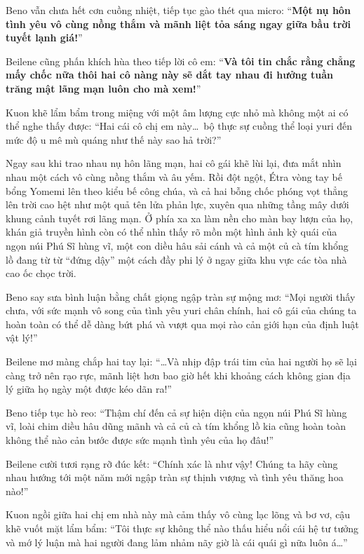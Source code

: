 \documentclass[../main.tex]{subfiles}
\begin{document}
Beno vẫn chưa hết cơn cuồng nhiệt, tiếp tục gào thét qua micro: ``\textbf{Một nụ hôn tình yêu vô cùng nồng thắm và mãnh liệt tỏa sáng ngay giữa bầu trời tuyết lạnh giá!}''

Beilene cũng phấn khích hùa theo tiếp lời cô em: ``\textbf{Và tôi tin chắc rằng chẳng mấy chốc nữa thôi hai cô nàng này sẽ dắt tay nhau đi hưởng tuần trăng mật lãng mạn luôn cho mà xem!}''

Kuon khẽ lẩm bẩm trong miệng với một âm lượng cực nhỏ mà không một ai có thể nghe thấy được: ``Hai cái cô chị em này\dots\ bộ thực sự cuồng thể loại yuri đến mức độ u mê mù quáng như thế này sao hả trời?''

Ngay sau khi trao nhau nụ hôn lãng mạn, hai cô gái khẽ lùi lại, đưa mắt nhìn nhau một cách vô cùng nồng thắm và âu yếm. Rồi đột ngột, Étra vòng tay bế bổng Yomemi lên theo kiểu bế công chúa, và cả hai bỗng chốc phóng vọt thẳng lên trời cao hệt như một quả tên lửa phản lực, xuyên qua những tầng mây dưới khung cảnh tuyết rơi lãng mạn. Ở phía xa xa làm nền cho màn bay lượn của họ, khán giả truyền hình còn có thể nhìn thấy rõ mồn một hình ảnh kỳ quái của ngọn núi Phú Sĩ hùng vĩ, một con diều hâu sải cánh và cả một củ cà tím khổng lồ đang từ từ ``đứng dậy'' một cách đầy phi lý ở ngay giữa khu vực các tòa nhà cao ốc chọc trời.

Beno say sưa bình luận bằng chất giọng ngập tràn sự mộng mơ: ``Mọi người thấy chưa, với sức mạnh vô song của tình yêu yuri chân chính, hai cô gái của chúng ta hoàn toàn có thể dễ dàng bứt phá và vượt qua mọi rào cản giới hạn của định luật vật lý!''

Beilene mơ màng chắp hai tay lại: ``\dots Và nhịp đập trái tim của hai người họ sẽ lại càng trở nên rạo rực, mãnh liệt hơn bao giờ hết khi khoảng cách không gian địa lý giữa họ ngày một được kéo dãn ra!''

Beno tiếp tục hò reo: ``Thậm chí đến cả sự hiện diện của ngọn núi Phú Sĩ hùng vĩ, loài chim diều hâu dũng mãnh và cả củ cà tím khổng lồ kia cũng hoàn toàn không thể nào cản bước được sức mạnh tình yêu của họ đâu!''

Beilene cười tươi rạng rỡ đúc kết: ``Chính xác là như vậy! Chúng ta hãy cùng nhau hướng tới một năm mới ngập tràn sự thịnh vượng và tình yêu thăng hoa nào!''

Kuon ngồi giữa hai chị em nhà này mà cảm thấy vô cùng lạc lõng và bơ vơ, cậu khẽ vuốt mặt lẩm bẩm: ``Tôi thực sự không thể nào thấu hiểu nổi cái hệ tư tưởng và mớ lý luận mà hai người đang lảm nhảm nãy giờ là cái quái gì nữa luôn á\dots''
\end{document}
